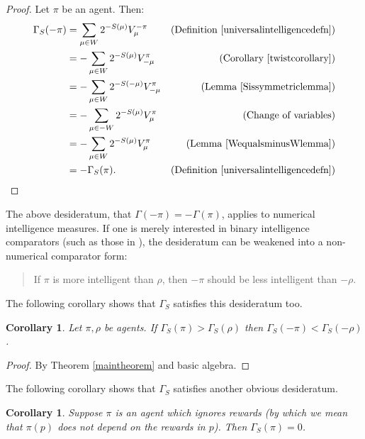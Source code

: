 \documentclass{article}
\newtheorem{corollary}[theorem]{Corollary}
\def\SYM{S}
\begin{document}
\begin{proof}
    Let $\pi$ be an agent. Then:
    \begin{align*}
        \Gamma_{\SYM}(-\pi) &= \sum_{\mu\in W} 2^{-S(\mu)}V^{-\pi}_\mu
            &\mbox{(Definition \ref{universalintelligencedefn})}\\
          &= -\sum_{\mu\in W} 2^{-S(\mu)}V^\pi_{-\mu}
            &\mbox{(Corollary \ref{twistcorollary})}\\
          &= -\sum_{\mu\in W} 2^{-S(-\mu)}V^\pi_{-\mu}
            &\mbox{(Lemma \ref{Sissymmetriclemma})}\\
          &= -\sum_{\mu\in -W} 2^{-S(\mu)}V^\pi_\mu
            &\mbox{(Change of variables)}\\
          &= -\sum_{\mu\in W} 2^{-S(\mu)}V^\pi_\mu
            &\mbox{(Lemma \ref{WequalsminusWlemma})}\\
          &= -\Gamma_{\SYM}(\pi).
            &\mbox{(Definition \ref{universalintelligencedefn})}
    \end{align*}
\end{proof}

The above desideratum, that $\Gamma(-\pi)=-\Gamma(\pi)$, applies to
numerical intelligence measures. If one is merely interested in binary
intelligence comparators (such as those in \cite{alexander2019intelligence}),
the desideratum can be weakened into a non-numerical comparator form:
\begin{quote}
    If $\pi$ is more intelligent than $\rho$,
    then $-\pi$ should be less intelligent than $-\rho$.
\end{quote}
The following corollary shows that $\Gamma_{\SYM}$ satisfies this desideratum too.

\begin{corollary}
\label{comparatorcorollary}
    Let $\pi,\rho$ be agents. If $\Gamma_{\SYM}(\pi)>\Gamma_{\SYM}(\rho)$
    then $\Gamma_{\SYM}(-\pi)<\Gamma_{\SYM}(-\rho)$.
\end{corollary}

\begin{proof}
    By Theorem \ref{maintheorem} and basic algebra.
\end{proof}

The following corollary shows that $\Gamma_{\SYM}$ satisfies another obvious
desideratum.

\begin{corollary}
\label{ignoringrewardscorollary}
    Suppose $\pi$ is an agent which ignores rewards (by which we mean that
    $\pi(p)$ does not depend on the rewards in $p$).
    Then $\Gamma_{\SYM}(\pi)=0$.
\end{corollary}
\end{document}
